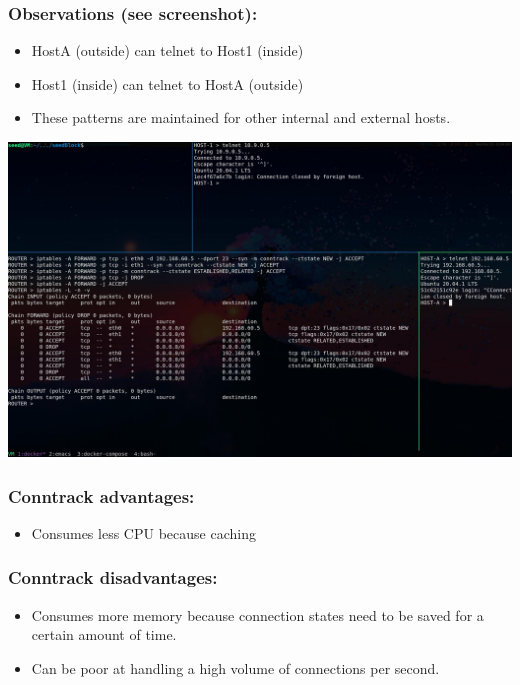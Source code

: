 \documentclass[11pt]{article}
\begin{document}
\subsubsection*{Observations (see screenshot):}
\label{sec:orge8a8a2b}
\begin{itemize}
\item HostA (outside) can telnet to Host1 (inside)
\item Host1 (inside) can telnet to HostA (outside)
\item These patterns are maintained for other internal and external hosts.
\end{itemize}
\begin{center}
\includegraphics[width=.9\linewidth]{./images/09.jpg}
\end{center}
\subsubsection*{Conntrack advantages:}
\label{sec:orgc6da0ea}
\begin{itemize}
\item Consumes less CPU because caching
\end{itemize}
\subsubsection*{Conntrack disadvantages:}
\label{sec:org42f3293}
\begin{itemize}
\item Consumes more memory because connection states need to be saved for a certain amount of time.
\item Can be poor at handling a high volume of connections per second.
\end{itemize}
\end{document}
